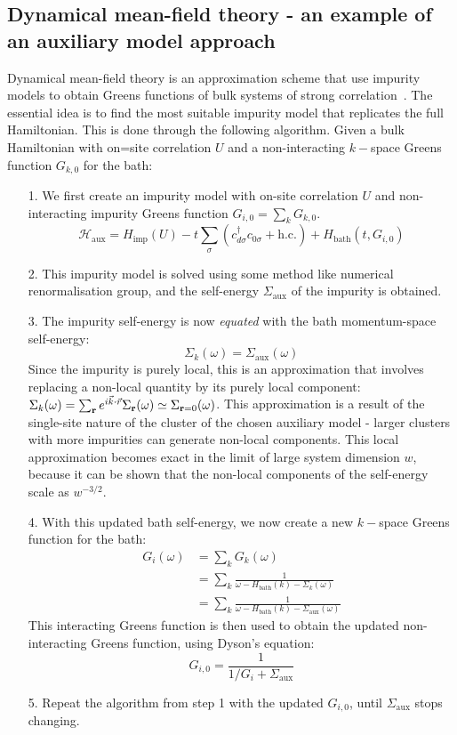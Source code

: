 \documentclass[reprint,hidelinks,onecolumn]{revtex4-2}
\begin{document}
\subsection*{Dynamical mean-field theory - an example of an auxiliary model approach}
Dynamical mean-field theory is an approximation scheme that use impurity models to obtain Greens functions of bulk systems of strong correlation~\cite{kotliar1996,kotliar1992}. The essential idea is to find the most suitable impurity model that replicates the full Hamiltonian. This is done through the following algorithm. Given a bulk Hamiltonian with on=site correlation \(U\) and a non-interacting \(k-\)space Greens function \(G_{k,0}\) for the bath:
\begin{itemize}
	\item[1.] We first create an impurity model with on-site correlation \(U\) and non-interacting impurity Greens function \(G_{i,0} = \sum_k G_{k,0}\).
		\[\mathcal{H}_\text{aux} = H_\text{imp}(U) -t \sum_\sigma \left(c^\dagger_{d\sigma}c_{0\sigma} + \text{h.c.}\right) + H_\text{bath}\left(t,G_{i,0}\right)\]

	\item[2.] This impurity model is solved using some method like numerical renormalisation group, and the self-energy \(\Sigma_\text{aux}\) of the impurity is obtained.

	\item[3.] The impurity self-energy is now {\it equated} with the bath momentum-space self-energy:
		\[\Sigma_{k}(\omega) = \Sigma_\text{aux}(\omega)\]
		Since the impurity is purely local, this is an approximation that involves replacing a non-local quantity by its purely local component: \(\Sigma_{k}(\omega) = \sum_{{\bf r}}e^{i \vec{k}\cdot\vec{r}}\Sigma_{{\bf r}}(\omega) \simeq \Sigma_{{\bf r} = 0}(\omega)\). This approximation is a result of the single-site nature of the cluster of the chosen auxiliary model - larger clusters with more impurities can generate non-local components. This local approximation becomes exact in the limit of large system dimension \(w\), because it can be shown that the non-local components of the self-energy scale as \(w^{-3/2}\).

	\item[4.] With this updated bath self-energy, we now create a new \(k-\)space Greens function for the bath:
		\begin{equation}\begin{aligned}
		G_{i}(\omega) &= \sum_k G_{k}(\omega) \\
			      &= \sum_k \frac{1}{\omega - H_\text{bath}(k) - \Sigma_k(\omega)} \\
			      &= \sum_k \frac{1}{\omega - H_\text{bath}(k) - \Sigma_\text{aux}(\omega)}
		\end{aligned}\end{equation}
	This interacting Greens function is then used to obtain the updated non-interacting Greens function, using Dyson's equation:
	\[G_{i,0} = \frac{1}{1/G_{i} + \Sigma_\text{aux}}\]
	\item[5.] Repeat the algorithm from step 1 with the updated \(G_{i,0}\), until \(\Sigma_\text{aux}\) stops changing.
\end{itemize}
\end{document}

